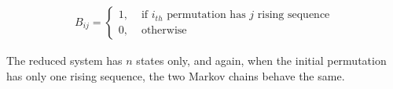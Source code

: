 \documentclass{article}
\begin{document}
    
\begin{eqnarray}
B_{ij} = \left\{ \begin{array}{cc}
                 1,&\mbox{ if } i_{th} \mbox{ permutation has } j \mbox{ rising sequence}\\
                 0,&\mbox{ otherwise}
                 \end{array} \right.
\end{eqnarray}

The reduced system has $n$ states only, and again, when the initial permutation has only one rising sequence, the two Markov chains behave the same. 




 

\cite{Stroock2002}
\cite{Diaconis1990}
\cite{Diaconis2001}
\cite{Diaconis1986}
\cite{Diaconis1992}

\cite{Gilbert1955}
\end{document}
